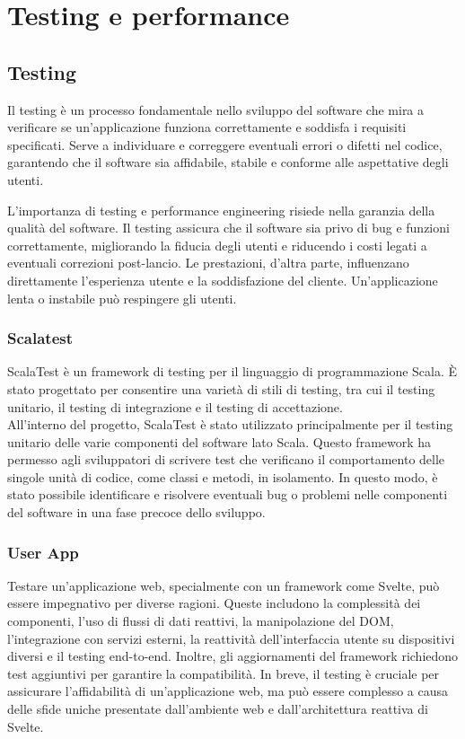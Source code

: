 
\section{Testing e performance}

\subsection{Testing}
Il testing è un processo fondamentale nello sviluppo del software che mira a verificare se un'applicazione
funziona correttamente e soddisfa i requisiti specificati. Serve a individuare e correggere eventuali
errori o difetti nel codice, garantendo che il software sia affidabile, stabile e conforme alle aspettative degli utenti.

L'importanza di testing e performance engineering risiede nella garanzia della qualità del software.
Il testing assicura che il software sia privo di bug e funzioni correttamente, migliorando la fiducia
degli utenti e riducendo i costi legati a eventuali correzioni post-lancio. Le prestazioni,
d'altra parte, influenzano direttamente l'esperienza utente e la soddisfazione del cliente.
Un'applicazione lenta o instabile può respingere gli utenti.

\subsubsection{Scalatest}
ScalaTest è un framework di testing per il linguaggio di programmazione Scala.
È stato progettato per consentire una varietà di stili di testing, tra cui il testing unitario,
il testing di integrazione e il testing di accettazione.\\

All'interno del progetto, ScalaTest è stato utilizzato principalmente per il testing
unitario delle varie componenti del software lato Scala. Questo framework ha permesso agli
sviluppatori di scrivere test che verificano il comportamento delle singole unità di codice,
come classi e metodi, in isolamento. In questo modo, è stato possibile identificare e risolvere
eventuali bug o problemi nelle componenti del software in una fase precoce dello sviluppo.

\subsubsection{User App}
Testare un'applicazione web, specialmente con un framework come Svelte, può essere
impegnativo per diverse ragioni. Queste includono la complessità dei componenti,
l'uso di flussi di dati reattivi, la manipolazione del DOM, l'integrazione con servizi
esterni, la reattività dell'interfaccia utente su dispositivi diversi e il testing end-to-end.
Inoltre, gli aggiornamenti del framework richiedono test aggiuntivi per garantire la compatibilità.
In breve, il testing è cruciale per assicurare l'affidabilità di un'applicazione web, ma può essere
complesso a causa delle sfide uniche presentate dall'ambiente web e dall'architettura reattiva di Svelte.


